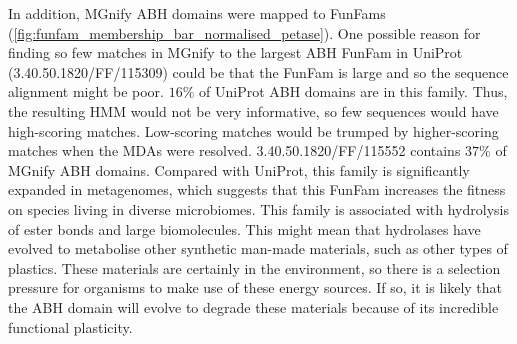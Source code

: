 In addition, MGnify ABH domains were mapped to FunFams (\ref{fig:funfam_membership_bar_normalised_petase}). One possible reason for finding so few matches in MGnify to the largest ABH FunFam in UniProt (3.40.50.1820/FF/115309) could be that the FunFam is large and so the sequence alignment might be poor. $16\%$ of UniProt ABH domains are in this family. Thus, the resulting HMM would not be very informative, so few sequences would have high-scoring matches. Low-scoring matches would be trumped by higher-scoring matches when the MDAs were resolved. 3.40.50.1820/FF/115552 contains $37\%$ of MGnify ABH domains. Compared with UniProt, this family is significantly expanded in metagenomes, which suggests that this FunFam increases the fitness on species living in diverse microbiomes. This family is associated with hydrolysis of ester bonds and large biomolecules. This might mean that hydrolases have evolved to metabolise other synthetic man-made materials, such as other types of plastics. These materials are certainly in the environment, so there is a selection pressure for organisms to make use of these energy sources. If so, it is likely that the ABH domain will evolve to degrade these materials because of its incredible functional plasticity.

